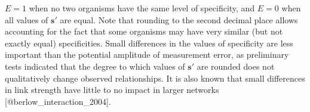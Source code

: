 $E = 1$ when no two organisms have the same level of specificity, and $E = 0$
when all values of $\mathbf{s}'$ are equal. Note that rounding to the second
decimal place allows accounting for the fact that some organisms may have
very similar (but not exactly equal) specificities. Small differences in
the values of specificity are less important than the potential amplitude of
measurement error, as preliminary tests indicated that the degree to which
values of $\mathbf{s}'$ are rounded does not qualitatively change observed
relationships. It is also known that small differences in link strength have
little to no impact in larger networks [@berlow_interaction_2004].
